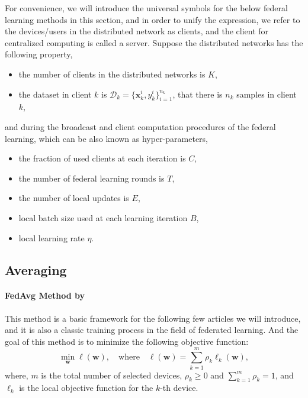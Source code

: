 \documentclass[a4paper,12pt,authoryear]{elegantpaper}
\begin{document}
For convenience, we will introduce the universal symbols for the below federal learning methods in this section, and in order to unify the expression, we refer to the devices/users in the distributed network as clients, and the client for centralized computing is called a server. Suppose the distributed networks has the following property,
\begin{itemize}
    \item the number of clients in the distributed networks is $K$,
    \item the dataset in client $k$ is $\mathcal{D}_{k}=\{\mathbf{x}_{k}^{i},y_{k}^{i}\}_{i=1}^{n_{k}}$, that there is $n_{k}$ samples in client $k$,
\end{itemize}
and during the broadcast and client computation procedures of the federal learning, which can be also known as hyper-parameters,
\begin{itemize}
    \item the fraction of used clients at each iteration is $C$,
    \item the number of federal learning rounds is $T$,
    \item the number of local updates is $E$,
    \item local batch size used at each learning iteration $B$,
    \item local learning rate $\eta$.
\end{itemize}

\subsection{Averaging}

\paragraph{FedAvg Method by \cite{mcmahan_communication-efficient_2017}}

This method is a basic framework for the following few articles we will introduce, and it is also a classic training process in the field of federated learning. And the goal of this method is to minimize the following objective function:
\begin{equation}
    \min_{\mathbf{w}}\ell(\mathbf{w}),\quad\text{where}\quad\ell(\mathbf{w})=\sum_{k=1}^{m}\rho_{k}\ell_{k}(\mathbf{w}),
\end{equation}
where, $m$ is the total number of selected devices, $\rho_{k}\geq 0$ and $\sum_{k=1}^{m}\rho_{k}=1$, and $\ell_{k}$ is the local objective function for the $k$-th device.
\end{document}
